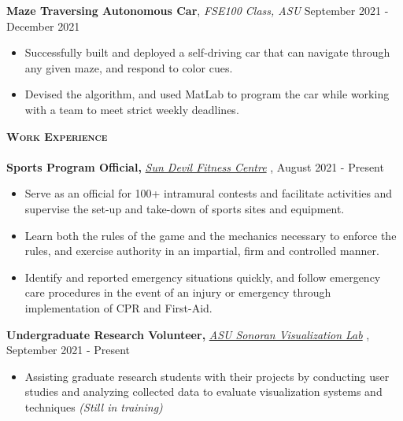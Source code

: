 \documentclass[a4paper]{article}
\newcommand{\lineunder} {
    \vspace*{-8pt} \\
    \hspace*{-18pt} \hrulefill \\
}
\newcommand{\header} [1] {
    {\hspace*{-15pt}\vspace*{3pt} \textsc{#1}}
    \vspace*{-6pt} \lineunder
}
\begin{document}
\textbf{Maze Traversing Autonomous Car}, \textit{FSE100 Class, ASU}
\hfill September 2021 - December 2021\\
\vspace{-3mm}
\begin{itemize}
    \item Successfully built and deployed a self-driving car that can navigate through any given maze, and respond to color cues. 
    \item Devised the algorithm, and used MatLab to program the car while working with a team to meet strict weekly deadlines. 
\end{itemize}

\vspace{-1mm}
    \header{\textbf{Work Experience}}

\textbf{Sports Program Official, } \textit{{\href{https://fitness.asu.edu/programs/intramurals}{Sun Devil Fitness Centre}} \faExternalLink},   \hfill August 2021 - Present\\
\vspace{-3mm}
\begin{itemize}
    \item Serve as an official for 100+ intramural contests and facilitate activities and supervise the set-up and take-down of sports sites and equipment.
    \item Learn both the rules of the game and the mechanics necessary to enforce the rules, and exercise authority in an impartial, firm and controlled manner. 
    \item Identify and reported emergency situations quickly, and follow emergency care procedures in the event of an injury or emergency through implementation of CPR and First-Aid. 
\end{itemize}

\textbf{Undergraduate Research Volunteer, } \textit{\href{https://news.asu.edu/20200225-solutions-data-driven-quest-resilient-power-systems}{ASU Sonoran Visualization Lab} \faExternalLink}, \hfill September 2021 - Present\\
\vspace{-3mm}
\begin{itemize}
    \item Assisting graduate research students with their projects by conducting user studies and analyzing collected data to evaluate visualization systems and techniques \textit{(Still in training)}
\end{itemize}
\end{document}
